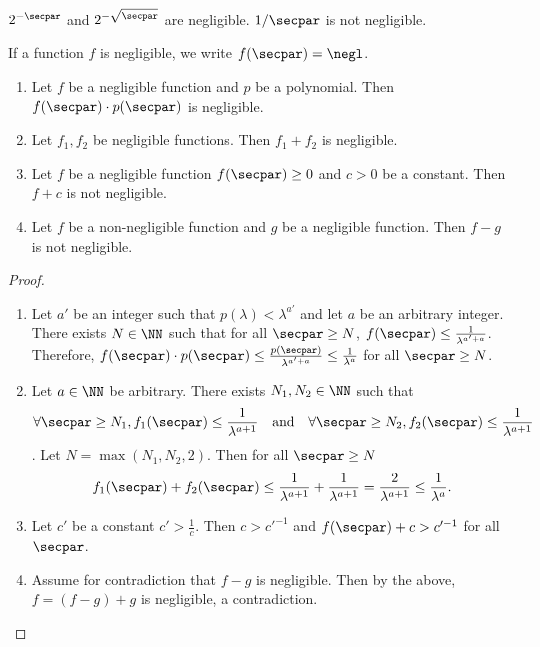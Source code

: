 \begin{example}
  $2^{-\secpar}$ and $2^{-\sqrt{\secpar}}$ are negligible. $1/\secpar$ is not negligible.
\end{example}

If a function $f$ is negligible, we write $f(\secpar) = \negl$.


\begin{proposition}
  \label{lem:negl}
  \hfill
  \begin{enumerate}
  \item Let $f$ be a negligible function and $p$ be a polynomial. Then $f(\secpar) \cdot p(\secpar)$ is negligible.
  \item Let $f_1, f_2$ be negligible functions. Then $f_1 + f_2$ is negligible.
  \item Let $f$ be a negligible function $f(\secpar) \ge 0$ and $c > 0$ be a constant. Then $f + c$ is not negligible.
  \item Let $f$ be a non-negligible function and $g$ be a negligible function. Then $f - g$ is not negligible.
  \end{enumerate}
\end{proposition}
\begin{proof}
  \hfill
  \begin{enumerate}
  \item Let $a'$ be an integer such that $p(\lambda) < \lambda^{a'}$ and let $a$ be an arbitrary integer.
    There exists $N \in \NN$ such that for all $\secpar \ge N$, $f(\secpar) \le \frac{1}{\lambda^{a' + a}}$.
    Therefore, $f(\secpar) \cdot p(\secpar) \le \frac{p(\secpar)}{\lambda^{a' + a}} \le \frac{1}{\lambda^{a}}$ for all $\secpar \ge N$.
  \item Let $a \in \NN$ be arbitrary.
    There exists $N_1, N_2 \in \NN$ such that
    \[
    \forall \secpar \ge N_1, f_1(\secpar) \le \frac{1}{\lambda^{a+1}} \quad \text{and} \quad \forall \secpar \ge N_2, f_2(\secpar) \le \frac{1}{\lambda^{a+1}}
    \].
    Let $N = \max(N_1, N_2, 2)$. Then for all $\secpar \ge N$
    \[
      f_1(\secpar) + f_2(\secpar) \le \frac{1}{\lambda^{a+1}} + \frac{1}{\lambda^{a+1}} = \frac{2}{\lambda^{a+1}} \le \frac{1}{\lambda^{a}}.
    \]
  \item Let $c'$ be a constant $c' > \frac{1}{c}$.
    Then $c > c'^{-1}$ and $f(\secpar) + c > c'^{-1}$ for all $\secpar$.
  \item Assume for contradiction that $f - g$ is negligible.
    Then by the above, $f = (f - g) + g$ is negligible, a contradiction.
  \end{enumerate}
\end{proof}


